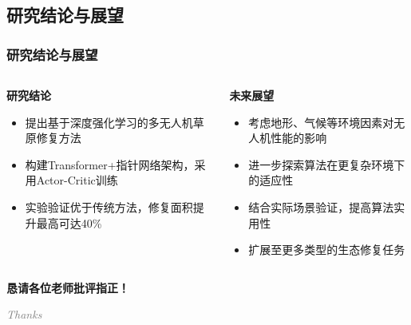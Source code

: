 \documentclass[10pt, aspectratio=169]{beamer}  %
\begin{document}
\subsection{研究结论与展望}
\begin{frame}
	\frametitle{研究结论与展望}
	\begin{columns}[T] %
		\begin{column}{0.5\textwidth}
			\textbf{研究结论}
			\begin{itemize}
				\item 提出基于深度强化学习的多无人机草原修复方法
				\item 构建Transformer+指针网络架构，采用Actor-Critic训练
				\item 实验验证优于传统方法，修复面积提升最高可达40\%
			\end{itemize}
		\end{column}
		\begin{column}{0.5\textwidth}
			\textbf{未来展望}
			\begin{itemize}
				\item 考虑地形、气候等环境因素对无人机性能的影响
				\item 进一步探索算法在更复杂环境下的适应性
				\item 结合实际场景验证，提高算法实用性
				\item 扩展至更多类型的生态修复任务
			\end{itemize}
		\end{column}
	\end{columns}
\end{frame}

\begin{frame}
	\begin{center}
		\vspace{2cm}
		{\Huge \sffamily\bfseries\textcolor{njupt}{恳请各位老师批评指正！}} %
		\vspace{0.5cm}

		{\large \itshape\textcolor{gray}{Thanks}}
	\end{center}
\end{frame}
\end{document}
